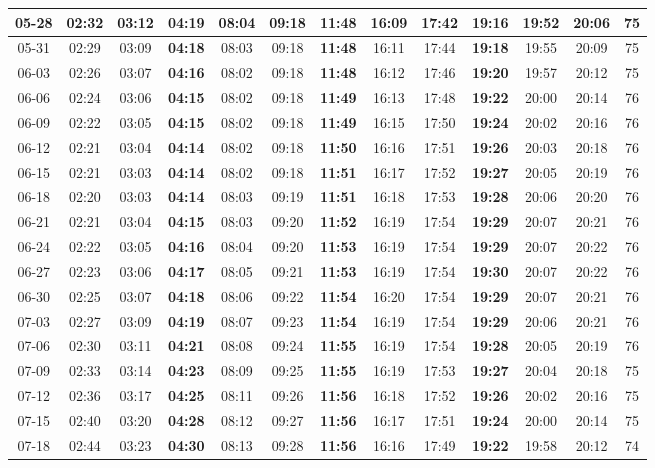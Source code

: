 \begin{footnotesize}
\begin{longtable}{c | c | c | c | c | c | c | c | c | c | c | c | c}
		05-28&02:32&03:12&\textbf{04:19}&08:04&09:18&\textbf{11:48}&16:09&17:42&\textbf{19:16}&19:52&20:06&75\\\hline
		05-31&02:29&03:09&\textbf{04:18}&08:03&09:18&\textbf{11:48}&16:11&17:44&\textbf{19:18}&19:55&20:09&75\\\hline
		06-03&02:26&03:07&\textbf{04:16}&08:02&09:18&\textbf{11:48}&16:12&17:46&\textbf{19:20}&19:57&20:12&75\\\hline
		06-06&02:24&03:06&\textbf{04:15}&08:02&09:18&\textbf{11:49}&16:13&17:48&\textbf{19:22}&20:00&20:14&76\\\hline
		06-09&02:22&03:05&\textbf{04:15}&08:02&09:18&\textbf{11:49}&16:15&17:50&\textbf{19:24}&20:02&20:16&76\\\hline
		06-12&02:21&03:04&\textbf{04:14}&08:02&09:18&\textbf{11:50}&16:16&17:51&\textbf{19:26}&20:03&20:18&76\\\hline
		06-15&02:21&03:03&\textbf{04:14}&08:02&09:18&\textbf{11:51}&16:17&17:52&\textbf{19:27}&20:05&20:19&76\\\hline
		06-18&02:20&03:03&\textbf{04:14}&08:03&09:19&\textbf{11:51}&16:18&17:53&\textbf{19:28}&20:06&20:20&76\\\hline
		06-21&02:21&03:04&\textbf{04:15}&08:03&09:20&\textbf{11:52}&16:19&17:54&\textbf{19:29}&20:07&20:21&76\\\hline
		06-24&02:22&03:05&\textbf{04:16}&08:04&09:20&\textbf{11:53}&16:19&17:54&\textbf{19:29}&20:07&20:22&76\\\hline
		06-27&02:23&03:06&\textbf{04:17}&08:05&09:21&\textbf{11:53}&16:19&17:54&\textbf{19:30}&20:07&20:22&76\\\hline
		06-30&02:25&03:07&\textbf{04:18}&08:06&09:22&\textbf{11:54}&16:20&17:54&\textbf{19:29}&20:07&20:21&76\\\hline
		07-03&02:27&03:09&\textbf{04:19}&08:07&09:23&\textbf{11:54}&16:19&17:54&\textbf{19:29}&20:06&20:21&76\\\hline
		07-06&02:30&03:11&\textbf{04:21}&08:08&09:24&\textbf{11:55}&16:19&17:54&\textbf{19:28}&20:05&20:19&76\\\hline
		07-09&02:33&03:14&\textbf{04:23}&08:09&09:25&\textbf{11:55}&16:19&17:53&\textbf{19:27}&20:04&20:18&75\\\hline
		07-12&02:36&03:17&\textbf{04:25}&08:11&09:26&\textbf{11:56}&16:18&17:52&\textbf{19:26}&20:02&20:16&75\\\hline
		07-15&02:40&03:20&\textbf{04:28}&08:12&09:27&\textbf{11:56}&16:17&17:51&\textbf{19:24}&20:00&20:14&75\\\hline
		07-18&02:44&03:23&\textbf{04:30}&08:13&09:28&\textbf{11:56}&16:16&17:49&\textbf{19:22}&19:58&20:12&74\\\hline

\end{longtable}
\end{footnotesize}
